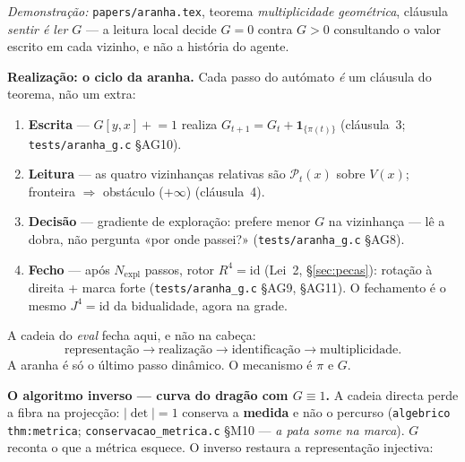 \documentclass[11pt,a4paper]{article}
\newcommand{\code}[1]{\texttt{\small #1}}
\begin{document}
\noindent\emph{Demonstração:} \code{papers/aranha.tex}, teorema
\emph{multiplicidade geométrica}, cláusula \emph{sentir é ler $G$} --- a leitura
local decide $G=0$ contra $G>0$ consultando o valor escrito em cada vizinho, e
não a história do agente.

\medskip\noindent\textbf{Realização: o ciclo da aranha.}
Cada passo do autómato \emph{é} um cláusula do teorema, não um extra:
\begin{enumerate}\itemsep3pt
\item \textbf{Escrita} --- $G[y,x]\mathrel{+}=1$ realiza
      $G_{t+1}=G_{t}+\mathbf{1}_{\{\pi(t)\}}$ (cláusula~3;
      \code{tests/aranha\_g.c} §AG10).
\item \textbf{Leitura} --- as quatro vizinhanças relativas são
      $\mathcal{P}_{t}(x)$ sobre $V(x)$; fronteira $\Rightarrow$ obstáculo
      ($+\infty$) (cláusula~4).
\item \textbf{Decisão} --- gradiente de exploração: prefere menor $G$ na
      vizinhança --- lê a dobra, não pergunta «por onde passei?»
      (\code{tests/aranha\_g.c} §AG8).
\item \textbf{Fecho} --- após $N_{\mathrm{expl}}$ passos, rotor
      $R^{4}=\mathrm{id}$ (Lei~2, \S\ref{sec:pecas}): rotação à direita +
      marca forte (\code{tests/aranha\_g.c} §AG9, §AG11). O fechamento é o mesmo $J^{4}=\mathrm{id}$ da
      bidualidade, agora na grade.
\end{enumerate}

\medskip\noindent A cadeia do \emph{eval} fecha aqui, e não na cabeça:
\[
\boxed{
\text{representação}
\longrightarrow
\text{realização}
\longrightarrow
\text{identificação}
\longrightarrow
\text{multiplicidade}.
}
\]
A aranha é só o último passo dinâmico. O mecanismo é $\pi$ e $G$.

\medskip\noindent\textbf{O algoritmo inverso --- curva do dragão com $G\equiv1$.}
A cadeia directa perde a fibra na projecção: $|\det|=1$ conserva a
\textbf{medida} e não o percurso (\code{algebrico thm:metrica};
\code{conservacao\_metrica.c} §M10 --- \emph{a pata some na marca}).
$G$ reconta o que a métrica esquece. O inverso restaura a
representação injectiva:
\end{document}
